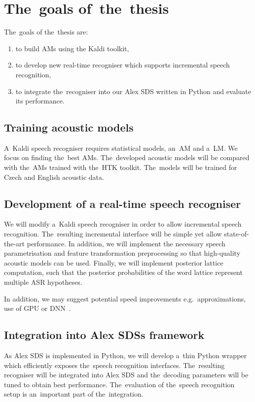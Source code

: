 \section{The~goals of~the~thesis} 
\label{sec:goals}
The~goals of the~thesis are:
\begin{enumerate}
    \item to build \acp{AM} using the Kaldi toolkit,
    \item to develop new real-time recogniser which supports incremental speech recognition,
    \item to integrate the~recogniser into our Alex \ac{SDS} written in Python and evaluate its performance.
\end{enumerate}

\subsection{Training acoustic models} 
\label{sub:training_kaldi_acoustic_models}
A~Kaldi speech recogniser requires statistical models, an~\acl{AM} and a~\acl{LM}. 
We focus on finding the~best \aclp{AM}. 
The~developed acoustic models will be compared with the~\acp{AM} trained with the~\ac{HTK} toolkit. 
The~models will be trained for Czech and English acoustic data.

\subsection{Development of a real-time speech recogniser} 
\label{sub:compare_rt}

We will modify a~Kaldi speech recogniser in order to allow incremental speech recognition.
The~resulting incremental interface will be simple yet allow state-of-the-art performance.
In addition, we will implement the necessary speech parametrisation and feature transformation preprocessing so that high-quality acoustic models can be used.
Finally, we will implement posterior lattice computation, such that the posterior probabilities of the word lattice represent multiple \ac{ASR} hypotheses.


In addition, we may suggest potential speed improvements e.g.\ approximations, use of \ac{GPU} or \ac{DNN}~\cite{vesely2013sequencediscriminative}.

\subsection[Integration into the Alex \acsp{SDS} framework]{Integration into Alex \aclp{SDS} framework} 
\label{sub:integration}
As Alex \acs{SDS} is implemented in Python, we will develop a~thin Python wrapper which efficiently exposes the~speech recognition interfaces.
The~resulting recogniser will be integrated into Alex \ac{SDS} and the~decoding parameters will be tuned to obtain best performance.
The~evaluation of the~speech recognition setup is an~important part of the~integration.

